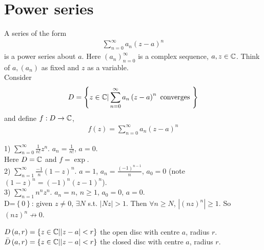 \documentclass[a4paper]{article}
\begin{document}
\section{Power series}
\begin{defi}
A series of the form
\begin{equation*}
\begin{aligned}
\sum_{n=0}^\infty a_n \left(z-a\right)^n
\end{aligned}
\end{equation*}
is a power series about $a$. Here $\left(a_n\right)_{n=0}^\infty$ is a complex sequence, $a,z\in\mathbb{C}$. Think of $a,\left(a_n\right)$ as fixed and $z$ as a variable.\\
Consider
\begin{equation*}
\begin{aligned}
D=\left\{z\in\mathbb{C} | \sum_{n=0}^\infty a_n \left(z-a\right)^n \text{  converges  } \right\}
\end{aligned}
\end{equation*}
and define $f:D\to \mathbb{C}$,
\begin{equation*}
\begin{aligned}
f\left(z\right)=\sum_{n=0}^\infty a_n \left(z-a\right)^n
\end{aligned}
\end{equation*}
\end{defi}

\begin{eg}
1) $\sum_{n=0}^\infty \frac{1}{n!}z^n$. $a_n = \frac{1}{n!}$, $a=0$.\\
Here $D=\mathbb{C}$ and $f=\exp$.\\
2) $\sum_{n=1}^\infty \frac{-1}{n}\left(1-z\right)^n$. $a=1$, $a_n = \frac{\left(-1\right)^{n-1}}{n}$, $a_0 = 0$ (note $\left(1-z\right)^n = \left(-1\right)^n \left(z-1\right)^n$).\\
3) $\sum_{n=1}^\infty n^n z^n$. $a_n = n$, $n\geq 1$, $a_0 = 0$, $a=0$.\\
D=$\left\{0\right\}$: given $z\neq 0$, $\exists N$ s.t. $|Nz|>1$. Then $\forall n\geq N$, $|\left(nz\right)^n| \geq 1$. So $\left(nz\right)^n \not\to 0$.
\end{eg}

\begin{notation}
$D\left(a,r\right)=\left\{z\in\mathbb{C}||z-a|<r\right\}$  the open disc with centre $a$, radius $r$.\\
$\bar{D}\left(a,r\right)=\left\{z\in\mathbb{C}||z-a|<r\right\}$  the closed disc with centre $a$, radius $r$.
\end{notation}
\end{document}
